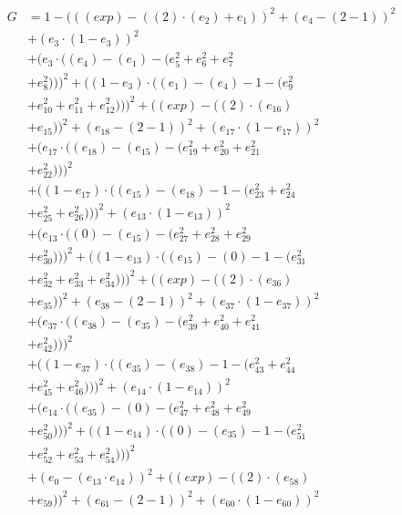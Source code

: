 \documentclass[10pt, a4paper]{article}
\begin{document}
\begin{small}
\begin{align*}
G &= 1 - (((exp) - ((2)  \cdot  (e_{2}) + e_{1}))^{2} + (e_{4} - (2 - 1))^{2} \\
& + (e_{3}  \cdot  (1 - e_{3}))^{2} \\
& + (e_{3}  \cdot  ((e_{4}) - (e_{1}) - (e_{5}^{2} + e_{6}^{2} + e_{7}^{2} \\
& + e_{8}^{2})))^{2} + ((1 - e_{3})  \cdot  ((e_{1}) - (e_{4}) - 1 - (e_{9}^{2} \\
& + e_{10}^{2} + e_{11}^{2} + e_{12}^{2})))^{2} + ((exp) - ((2)  \cdot  (e_{16}) \\
& + e_{15}))^{2} + (e_{18} - (2 - 1))^{2} + (e_{17}  \cdot  (1 - e_{17}))^{2} \\
& + (e_{17}  \cdot  ((e_{18}) - (e_{15}) - (e_{19}^{2} + e_{20}^{2} + e_{21}^{2} \\
& + e_{22}^{2})))^{2} \\
& + ((1 - e_{17})  \cdot  ((e_{15}) - (e_{18}) - 1 - (e_{23}^{2} + e_{24}^{2} \\
& + e_{25}^{2} + e_{26}^{2})))^{2} + (e_{13}  \cdot  (1 - e_{13}))^{2} \\
& + (e_{13}  \cdot  ((0) - (e_{15}) - (e_{27}^{2} + e_{28}^{2} + e_{29}^{2} \\
& + e_{30}^{2})))^{2} + ((1 - e_{13})  \cdot  ((e_{15}) - (0) - 1 - (e_{31}^{2} \\
& + e_{32}^{2} + e_{33}^{2} + e_{34}^{2})))^{2} + ((exp) - ((2)  \cdot  (e_{36}) \\
& + e_{35}))^{2} + (e_{38} - (2 - 1))^{2} + (e_{37}  \cdot  (1 - e_{37}))^{2} \\
& + (e_{37}  \cdot  ((e_{38}) - (e_{35}) - (e_{39}^{2} + e_{40}^{2} + e_{41}^{2} \\
& + e_{42}^{2})))^{2} \\
& + ((1 - e_{37})  \cdot  ((e_{35}) - (e_{38}) - 1 - (e_{43}^{2} + e_{44}^{2} \\
& + e_{45}^{2} + e_{46}^{2})))^{2} + (e_{14}  \cdot  (1 - e_{14}))^{2} \\
& + (e_{14}  \cdot  ((e_{35}) - (0) - (e_{47}^{2} + e_{48}^{2} + e_{49}^{2} \\
& + e_{50}^{2})))^{2} + ((1 - e_{14})  \cdot  ((0) - (e_{35}) - 1 - (e_{51}^{2} \\
& + e_{52}^{2} + e_{53}^{2} + e_{54}^{2})))^{2} \\
& + (e_{0} - (e_{13}  \cdot  e_{14}))^{2} + ((exp) - ((2)  \cdot  (e_{58}) \\
& + e_{59}))^{2} + (e_{61} - (2 - 1))^{2} + (e_{60}  \cdot  (1 - e_{60}))^{2} \\

\end{align*}
\end{small}
\end{document}
